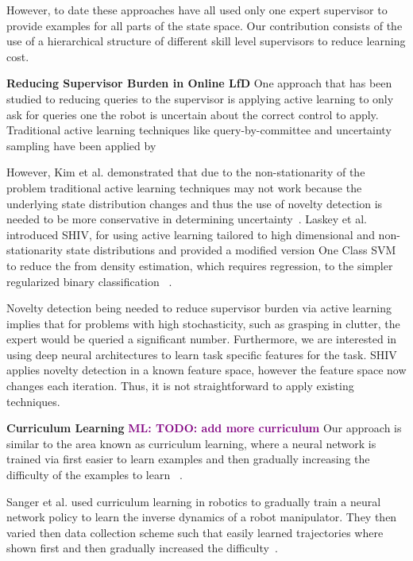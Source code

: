 \documentclass[10pt, conference]{ieeeconf}      %
\newcommand{\mlnote}[1]{\ifthenelse{ \boolean{include-notes}}%
 {\textcolor{purple}{\textbf{ML: #1}}}{}}
\begin{document}
However, to date these approaches have all used only one expert supervisor to provide examples for all parts of the state space. Our contribution consists of the use of a hierarchical structure of different skill level supervisors to reduce learning cost. 

\noindent\textbf{Reducing Supervisor Burden in Online LfD} One approach that has been studied to reducing queries to the supervisor is applying active learning to only ask for queries one the robot is uncertain about the correct control to apply. Traditional active learning techniques like query-by-committee and uncertainty sampling have been applied by \cite{chernova2009interactive,judah2011active,grollman2007dogged}

However, Kim et al. demonstrated that due to the non-stationarity of the problem traditional active learning techniques may not work because the underlying state distribution changes and thus the use of novelty detection is needed to be more conservative in determining uncertainty~\cite{kim2013maximum}. Laskey et al. introduced SHIV, for using active learning tailored to high dimensional and non-stationarity state distributions and  provided a modified version One Class SVM to reduce the from density estimation, which requires regression, to the simpler regularized binary classification ~\cite{laskey}. 

Novelty detection being needed to reduce supervisor burden via active learning implies that for problems with high stochasticity, such as grasping in clutter, the expert would be queried a significant number. Furthermore, we are interested in using deep neural architectures to learn task specific features for the task. SHIV applies novelty detection in a known feature space, however the feature space now changes each iteration. Thus, it is not straightforward to apply existing techniques. 

\noindent\textbf{Curriculum Learning}
\mlnote{TODO: add more curriculum}
Our approach is similar to the area known as curriculum learning, where a neural network is trained via first  easier to learn examples and then gradually increasing the difficulty of the examples to learn ~\cite{bengio2009curriculum}.

Sanger et al. used curriculum learning in robotics to gradually train a neural network policy to learn the inverse dynamics of a robot manipulator. They then varied then data collection scheme such that easily learned trajectories where shown first and then gradually increased the difficulty~\cite{sanger1994neural}.
\end{document}
